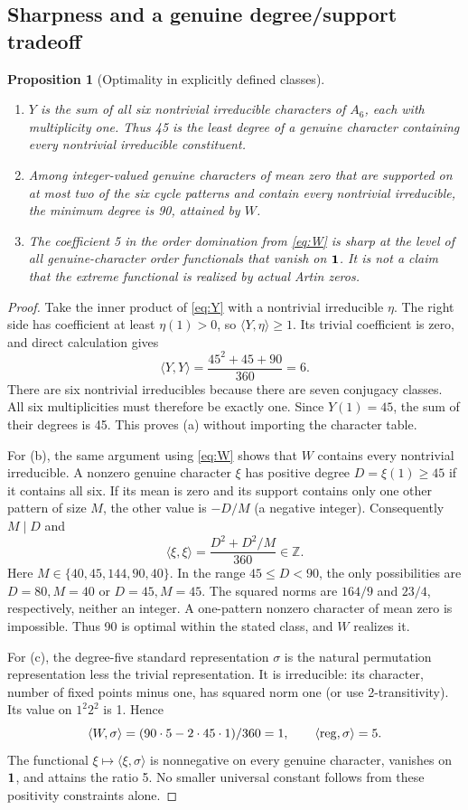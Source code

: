 \documentclass[11pt,letterpaper]{article}
\newtheorem{proposition}[theorem]{Proposition}
\theoremstyle{remark}\newtheorem{remark}[theorem]{Remark}
\begin{document}
\subsection{Sharpness and a genuine degree/support tradeoff}
\begin{proposition}[Optimality in explicitly defined classes]\label{prop:opt}
\begin{enumerate}[label=(\alph*)]
\item $Y$ is the sum of all six nontrivial irreducible characters of $A_6$, each with multiplicity one. Thus 45 is the least degree of a genuine character containing every nontrivial irreducible constituent.
\item Among integer-valued genuine characters of mean zero that are supported on at most two of the six cycle patterns and contain every nontrivial irreducible, the minimum degree is 90, attained by $W$.
\item The coefficient 5 in the order domination from \eqref{eq:W} is sharp at the level of all genuine-character order functionals that vanish on $\mathbf1$. It is not a claim that the extreme functional is realized by actual Artin zeros.
\end{enumerate}
\end{proposition}
\begin{proof}
Take the inner product of \eqref{eq:Y} with a nontrivial irreducible $\eta$. The right side has coefficient at least $\eta(1)>0$, so $\langle Y,\eta\rangle\ge1$. Its trivial coefficient is zero, and direct calculation gives
\[
 \langle Y,Y\rangle=\frac{45^2+45+90}{360}=6.
\]
There are six nontrivial irreducibles because there are seven conjugacy classes. All six multiplicities must therefore be exactly one. Since $Y(1)=45$, the sum of their degrees is 45. This proves (a) without importing the character table.

For (b), the same argument using \eqref{eq:W} shows that $W$ contains every nontrivial irreducible. A nonzero genuine character $\xi$ has positive degree $D=\xi(1)\ge45$ if it contains all six. If its mean is zero and its support contains only one other pattern of size $M$, the other value is $-D/M$ (a negative integer). Consequently $M\mid D$ and
\[
 \langle\xi,\xi\rangle=\frac{D^2+D^2/M}{360}\in\mathbb Z.
\]
Here $M\in\{40,45,144,90,40\}$. In the range $45\le D<90$, the only possibilities are $D=80,M=40$ or $D=45,M=45$. The squared norms are $164/9$ and $23/4$, respectively, neither an integer. A one-pattern nonzero character of mean zero is impossible. Thus 90 is optimal within the stated class, and $W$ realizes it.

For (c), the degree-five standard representation $\sigma$ is the natural permutation representation less the trivial representation. It is irreducible: its character, number of fixed points minus one, has squared norm one (or use 2-transitivity). Its value on $1^2 2^2$ is 1. Hence
\[
 \langle W,\sigma\rangle=(90\cdot5-2\cdot45\cdot1)/360=1,
 \qquad \langle\operatorname{reg},\sigma\rangle=5.
\]
The functional $\xi\mapsto\langle\xi,\sigma\rangle$ is nonnegative on every genuine character, vanishes on $\mathbf1$, and attains the ratio 5. No smaller universal constant follows from these positivity constraints alone.
\end{proof}
\end{document}
